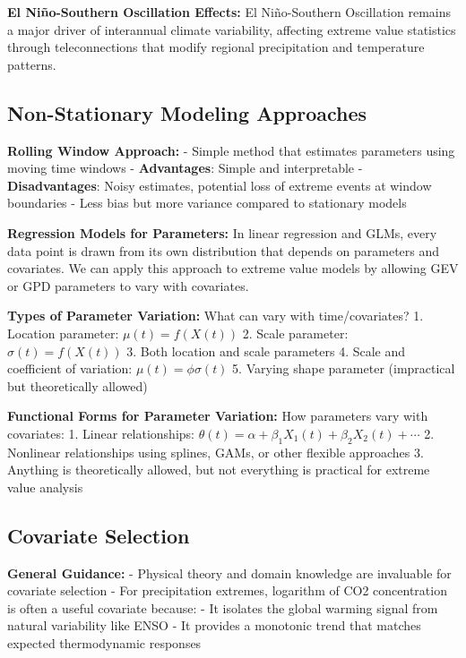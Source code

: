 \documentclass[
  letterpaper,
  DIV=11,
  numbers=noendperiod]{scrreprt}
\begin{document}
\textbf{El Niño-Southern Oscillation Effects:} El Niño-Southern
Oscillation remains a major driver of interannual climate variability,
affecting extreme value statistics through teleconnections that modify
regional precipitation and temperature patterns.

\subsection{Non-Stationary Modeling
Approaches}\label{non-stationary-modeling-approaches}

\textbf{Rolling Window Approach:} - Simple method that estimates
parameters using moving time windows - \textbf{Advantages}: Simple and
interpretable - \textbf{Disadvantages}: Noisy estimates, potential loss
of extreme events at window boundaries - Less bias but more variance
compared to stationary models

\textbf{Regression Models for Parameters:} In linear regression and
GLMs, every data point is drawn from its own distribution that depends
on parameters and covariates. We can apply this approach to extreme
value models by allowing GEV or GPD parameters to vary with covariates.

\textbf{Types of Parameter Variation:} What can vary with
time/covariates? 1. Location parameter: \(\mu(t) = f(X(t))\) 2. Scale
parameter: \(\sigma(t) = f(X(t))\) 3. Both location and scale parameters
4. Scale and coefficient of variation: \(\mu(t) = \phi \sigma(t)\) 5.
Varying shape parameter (impractical but theoretically allowed)

\textbf{Functional Forms for Parameter Variation:} How parameters vary
with covariates: 1. Linear relationships:
\(\theta(t) = \alpha + \beta_1 X_1(t) + \beta_2 X_2(t) + \cdots\) 2.
Nonlinear relationships using splines, GAMs, or other flexible
approaches 3. Anything is theoretically allowed, but not everything is
practical for extreme value analysis

\subsection{Covariate Selection}\label{covariate-selection}

\textbf{General Guidance:} - Physical theory and domain knowledge are
invaluable for covariate selection - For precipitation extremes,
logarithm of CO2 concentration is often a useful covariate because: - It
isolates the global warming signal from natural variability like ENSO -
It provides a monotonic trend that matches expected thermodynamic
responses
\end{document}
